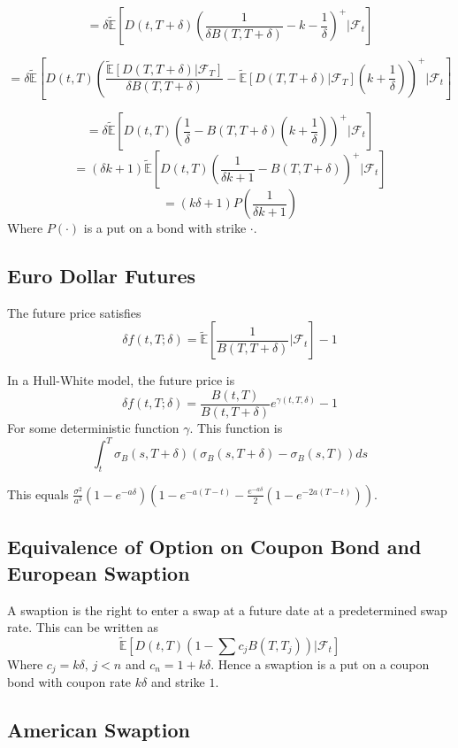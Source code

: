 \documentclass{article}
\theoremstyle{definition}
\begin{document}
\[=\delta\mathbb{\tilde{E}}\left[D(t, T+\delta)\left(\frac{1}{\delta B(T, T+\delta)}-k-\frac{1}{\delta}\right)^+ |\mathcal{F}_t\right]\]
 
\[=\delta\mathbb{\tilde{E}}\left[D(t, T)\left(\frac{ \mathbb{\tilde{E}}[D(T, T+\delta)|\mathcal{F}_T]}{\delta B(T, T+\delta)}-\mathbb{\tilde{E}}[D(T, T+\delta)|\mathcal{F}_T]\left(k+\frac{1}{\delta}\right)\right)^+ |\mathcal{F}_t\right]\]

\[=\delta\mathbb{\tilde{E}}\left[D(t, T)\left(\frac{1}{\delta}-B(T, T+\delta)\left(k+\frac{1}{\delta}\right)\right)^+ |\mathcal{F}_t\right]\]
\[=\left(\delta k+1\right)\mathbb{\tilde{E}}\left[D(t, T)\left(\frac{1}{\delta k+1}-B(T, T+\delta)\right)^+ |\mathcal{F}_t\right]\]
\[=\left(k\delta+1\right)P\left(\frac{1}{\delta k +1}\right)\] Where \(P(\cdot)\) is a put on a bond with strike \(\cdot\).

\subsection{Euro Dollar Futures}
The future price satisfies \[\delta f(t, T; \delta)=\tilde{\mathbb{E}}\left[\frac{1}{B(T, T+\delta)}|\mathcal{F}_t\right]-1\]

In a Hull-White model, the future price is \[\delta f(t, T; \delta)=\frac{B(t, T)}{B(t, T+\delta)}e^{\gamma(t, T, \delta)}-1\]
For some deterministic function \(\gamma\).  This function is \[\int_t ^ T \sigma_B (s, T+\delta)\left(\sigma_B(s, T+\delta)-\sigma_B(s, T)\right)ds\]

This equals \(\frac{\sigma^2}{a^3}\left(1-e^{-a\delta}\right)\left(1-e^{-a(T-t)}-\frac{e^{-a\delta}}{2}\left(1-e^{-2a(T-t)}\right)\right)\).

 \subsection{Equivalence of Option on Coupon Bond and European Swaption}
 
 A swaption is the right to enter a swap at a future date at a predetermined swap rate.  This can be written as
 \[\mathbb{\tilde{E}} \left[D(t, T)\left(1-\sum c_j B(T, T_j) \right) | \mathcal{F}_t \right]\]
 Where \(c_j=k\delta,\,j<n\) and \(c_n=1+k\delta\).  Hence a swaption is a put on a coupon bond with coupon rate \(k\delta\) and strike \(1\).  
 
\subsection{American Swaption}
\end{document}
